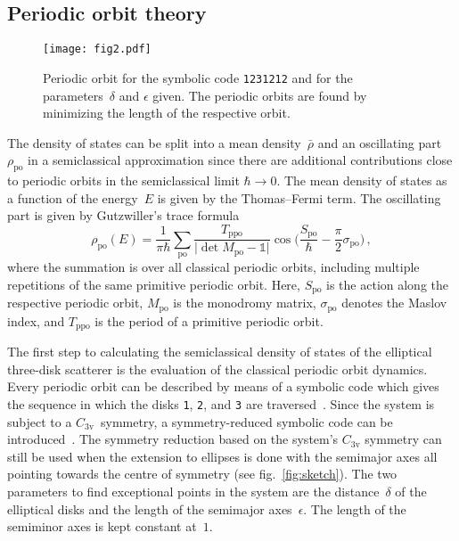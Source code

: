 \documentclass[doublecol]{epl2}
\begin{document}
\subsection{Periodic orbit theory}
\begin{figure}
  \centering
  \texttt{[image: fig2.pdf]}
  \caption{Periodic orbit for the symbolic code \texttt{1231212} and for the parameters~$\delta$ and $\epsilon$ given. The periodic orbits are found by minimizing the length of the respective orbit.}
  \label{fig:orbits_example}
\end{figure}

The density of states can be split into a mean density~$\bar{\rho}$ and an oscillating part~$\rho_\mathrm{po}$ in a semiclassical approximation since there are additional contributions close to periodic orbits in the semiclassical limit $\hbar \to 0$. The mean density of states as a function of the energy~$E$ is given by the Thomas--Fermi term. The oscillating part is given by Gutzwiller's trace formula
\begin{equation}
  \rho_\mathrm{po}(E) = \frac{1}{\pi \hbar} \sum_\mathrm{po} \frac{T_\mathrm{ppo}}{\lvert \det M_\mathrm{po} - \mathbb{1}\rvert} \cos\bigg(\frac{S_\mathrm{po}}{\hbar} - \frac{\pi}{2} \sigma_\mathrm{po}\bigg)\,,
  \label{eq:gutzwiller}
\end{equation}
where the summation is over all classical periodic orbits, including multiple repetitions of the same primitive periodic orbit. Here, $S_\mathrm{po}$ is the action along the respective periodic orbit, $M_\mathrm{po}$ is the monodromy matrix, $\sigma_\mathrm{po}$ denotes the Maslov index, and $T_\mathrm{ppo}$ is the period of a primitive periodic orbit.

The first step to calculating the semiclassical density of states of the elliptical three-disk scatterer is the evaluation of the classical periodic orbit dynamics. Every periodic orbit can be described by means of a symbolic code which gives the sequence in which the disks \texttt{1}, \texttt{2}, and \texttt{3} are traversed~\cite{gaspard_exact_1989}. Since the system is subject to a $C_{3\mathrm{v}}$~symmetry, a symmetry-reduced symbolic code can be introduced~\cite{cvitanovic_periodic-orbit_1989}. The symmetry reduction based on the system's $C_{3\mathrm{v}}$ symmetry can still be used when the extension to ellipses is done with the semimajor axes all pointing towards the centre of symmetry (see fig.~\ref{fig:sketch}). The two parameters to find exceptional points in the system are the distance~$\delta$ of the elliptical disks and the length of the semimajor axes~$\epsilon$. The length of the semiminor axes is kept constant at~$1$.
\end{document}

